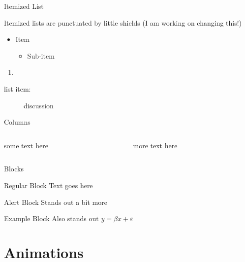 \documentclass[12pt]{beamer}
\begin{document}
\begin{frame}{Itemized List}

	Itemized lists are punctuated by little shields (I am working on changing this!)
	\begin{itemize}
		\item Item
			\begin{itemize}
				\item Sub-item
			\end{itemize}
	\end{itemize}
	\begin{enumerate}%
	\item
	\end{enumerate}
	\begin{description}
	\item[list item:] discussion
	\end{description}
\end{frame}
\begin{frame}{Columns}
\begin{columns}
	\begin{column}{0.5\textwidth}
   		some text here
	\end{column}
	\begin{column}{0.5\textwidth}
   		more text here
	\end{column}
\end{columns}
\end{frame}

\begin{frame}{Blocks}

	\begin{block}{Regular Block}
		Text goes here
	\end{block}

	\begin{alertblock}{Alert Block}
		Stands out a bit more
	\end{alertblock}

	\begin{exampleblock}{Example Block}
		Also stands out $y=\beta x+ \varepsilon$
	\end{exampleblock}

\end{frame}

\section{Animations}
\end{document}

